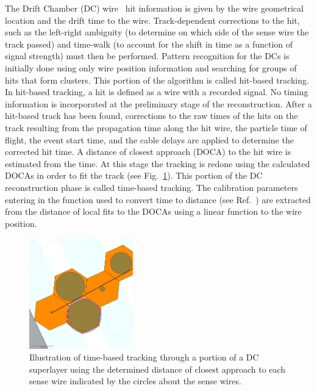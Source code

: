 The Drift Chamber (DC) wire~\cite{dc-nim} hit information is given by the wire geometrical location and the drift
time to the wire. Track-dependent corrections to the hit, such as the left-right ambiguity (to determine on which side
of the sense wire the track passed) and time-walk (to account for the shift in time as a function of signal strength)
must then be performed. Pattern recognition for the DCs is initially done using only wire position information and
searching for groups of hits that form clusters. This portion of the algorithm is called hit-based tracking.  In
hit-based tracking, a hit is defined as a wire with a recorded signal. No timing information is incorporated at the
preliminary stage of the reconstruction. After a hit-based track has been found, corrections to the raw times of
the hits on the track resulting from the propagation time along the hit wire, the particle time of flight, the event start
time, and the cable delays are applied to determine the corrected hit time. A distance of closest approach (DOCA)
to the hit wire is estimated from the time. At this stage the tracking is redone using the calculated DOCAs in order
to fit the track (see Fig.~\ref{fig:docas}). This portion of the DC reconstruction phase is called time-based tracking.
The calibration parameters entering in the function used to convert time to distance (see Ref.~\cite{dc-nim}) are
extracted from the distance of local fits to the DOCAs using a linear function to the wire position. 

\begin{figure}
\centering
\includegraphics[width=0.4\textwidth]{pics/dcPattern10.png}
\caption{Illustration of time-based tracking through a portion of a DC superlayer using the determined distance
  of closest approach to each sense wire indicated by the circles about the sense wires.}
\label{fig:docas}
\end{figure}

